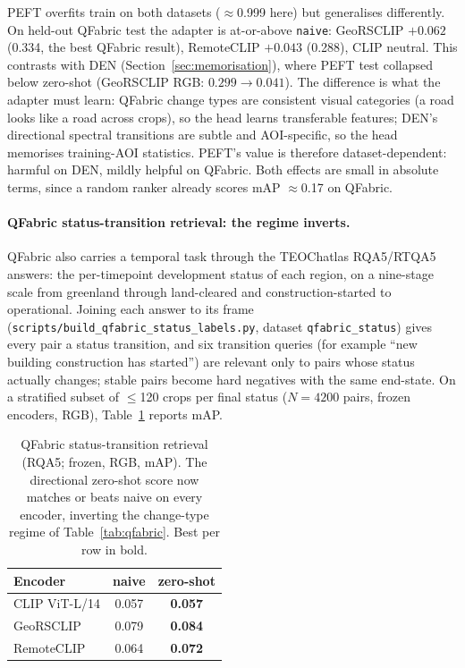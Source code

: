 \documentclass{article}
\begin{document}
PEFT overfits train on both datasets ($\approx$0.999 here) but generalises
differently. On held-out QFabric test the adapter is at-or-above \texttt{naive}:
GeoRSCLIP $+0.062$ (0.334, the best QFabric result), RemoteCLIP $+0.043$ (0.288),
CLIP neutral. This contrasts with DEN (Section~\ref{sec:memorisation}), where PEFT
test collapsed below zero-shot (GeoRSCLIP RGB: $0.299 \rightarrow 0.041$). The
difference is what the adapter must learn: QFabric change types are consistent
visual categories (a road looks like a road across crops), so the head learns
transferable features; DEN's directional spectral transitions are subtle and
AOI-specific, so the head memorises training-AOI statistics. PEFT's value is
therefore dataset-dependent: harmful on DEN, mildly helpful on QFabric. Both
effects are small in absolute terms, since a random ranker already scores mAP
$\approx$0.17 on QFabric.


\paragraph{QFabric status-transition retrieval: the regime inverts.}
QFabric also carries a temporal task through the TEOChatlas RQA5/RTQA5 answers:
the per-timepoint development status of each region, on a nine-stage scale from
greenland through land-cleared and construction-started to operational. Joining
each answer to its frame (\texttt{scripts/build\_qfabric\_status\_labels.py},
dataset \texttt{qfabric\_status}) gives every pair a status transition, and six
transition queries (for example ``new building construction has started'') are
relevant only to pairs whose status actually changes; stable pairs become hard
negatives with the same end-state. On a stratified subset of $\leq$120 crops per
final status ($N = 4200$ pairs, frozen encoders, RGB),
Table~\ref{tab:qfabricstatus} reports mAP.

\begin{table}[H]
    \centering
    \caption{QFabric status-transition retrieval (RQA5; frozen, RGB, mAP). The
    directional zero-shot score now matches or beats naive on every encoder,
    inverting the change-type regime of Table~\ref{tab:qfabric}. Best per row in bold.}
    \label{tab:qfabricstatus}
    \begin{tabular}{lcc}
        \toprule
        \textbf{Encoder} & \textbf{naive} & \textbf{zero-shot} \\
        \midrule
        CLIP ViT-L/14 & 0.057 & \textbf{0.057} \\
        GeoRSCLIP     & 0.079 & \textbf{0.084} \\
        RemoteCLIP    & 0.064 & \textbf{0.072} \\
        \bottomrule
    \end{tabular}
\end{table}
\end{document}
